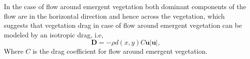 \documentclass[12pt]{report}   %
\newcommand{\bn}{{\boldsymbol{\hat{n}}}}
\newcommand{\bt}{{\boldsymbol{\hat{t}}}}
\newcommand{\bu}{\mathbf{u}}
\newcommand{\monami}{\textit{monami}}
\begin{document}
 In the case of flow around emergent vegetation both dominant components of the flow are in the horizontal direction and hence across the vegetation, which suggests that vegetation drag in case of flow around emergent vegetation can be modeled by an isotropic drag, i.e,
\begin{equation}
 \mathbf{D} = -\rho d(x,y) C \bu |\bu| ,%
\end{equation}
 Where $C$ is the drag coefficient for flow around emergent vegetation.
\end{document}
